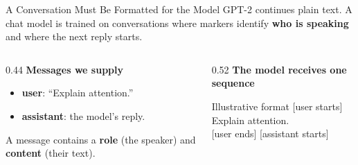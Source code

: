 \documentclass[aspectratio=169]{beamer}
\begin{document}
\begin{frame}{A Conversation Must Be Formatted for the Model}
  \small GPT-2 continues plain text. A chat model is trained on conversations where markers identify \textbf{who is speaking} and where the next reply starts.
  \par\vspace{0.5em}
  \begin{columns}[T,onlytextwidth]
    \begin{column}{0.44\linewidth}
      \textbf{Messages we supply}
      \begin{itemize}
        \item \textbf{user}: ``Explain attention.''
        \item \textbf{assistant}: the model's reply.
      \end{itemize}
      \small A message contains a \textbf{role} (the speaker) and \textbf{content} (their text).
    \end{column}
    \begin{column}{0.52\linewidth}
      \textbf{The model receives one sequence}
      \begin{block}{Illustrative format}
        \small [user starts] Explain attention.\\{}[user ends] [assistant starts]
      \end{block}
    \end{column}
  \end{columns}
\end{frame}
\end{document}

